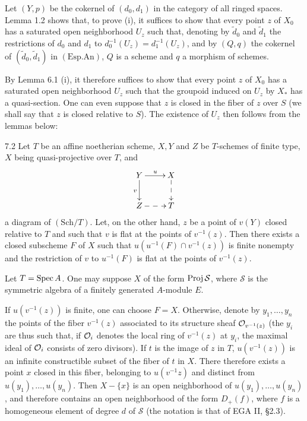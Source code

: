Let $(Y,p)$ be the cokernel of $(d_0,d_1)$ in the category of all ringed spaces. Lemma 1.2 shows that, to prove (i), it suffices to show that every point $z$ of $X_0$ has a saturated open neighborhood $U_z$ such that, denoting by $\widetilde d_0$ and $\widetilde d_1$ the restrictions of $d_0$ and $d_1$ to $d_0^{-1}(U_z)=d_1^{-1}(U_z)$, and by $(Q,q)$ the cokernel of $(\widetilde d_0,\widetilde d_1)$ in $(\mathrm{Esp.An})$, $Q$ is a scheme and $q$ a morphism of schemes.

By Lemma 6.1 (i), it therefore suffices to show that every point $z$ of $X_0$ has a saturated open neighborhood $U_z$ such that the groupoid induced on $U_z$ by $X_*$ has a quasi-section. One can even suppose that $z$ is closed in the fiber of $z$ over $S$ (we shall say that $z$ is closed relative to $S$). The existence of $U_z$ then follows from the lemmas below:
\begin{lemma}{7.2}\label{V.7.2}
Let $T$ be an affine noetherian scheme, $X,Y$ and $Z$ be $T$-schemes of finite type, $X$ being quasi-projective over $T$, and
\[
\xymatrix{Y\ar[r]^u\ar[d]_v&X\ar@{-->}[d]\\Z\ar@{-->}[r]&T}
\]
a diagram of $(\mathrm{Sch}/T)$. Let, on the other hand, $z$ be a point of $v(Y)$ closed relative to $T$ and such that $v$ is flat at the points of $v^{-1}(z)$. Then there exists a closed subscheme $F$ of $X$ such that $u(u^{-1}(F)\cap v^{-1}(z))$ is finite nonempty and the restriction of $v$ to $u^{-1}(F)$ is flat at the points of $v^{-1}(z)$.
\end{lemma}
Let $T=\operatorname{Spec} A$. One may suppose $X$ of the form $\operatorname{Proj}\mathcal S$, where $\mathcal S$ is the symmetric algebra of a finitely generated $A$-module $E$.

If $u(v^{-1}(z))$ is finite, one can choose $F=X$. Otherwise, denote by $y_1,\ldots,y_n$ the points of the fiber $v^{-1}(z)$ associated to its structure sheaf $\mathcal{O}_{v^{-1}(z)}$ (the $y_i$ are thus such that, if $\mathcal{O}_i$ denotes the local ring of $v^{-1}(z)$ at $y_i$, the maximal ideal of $\mathcal{O}_i$ consists of zero divisors). If $t$ is the image of $z$ in $T$, $u(v^{-1}(z))$ is an infinite constructible subset of the fiber of $t$ in $X$. There therefore exists a point $x$ closed in this fiber, belonging to $u(v^{-1}z)$ and distinct from $u(y_1),\ldots,u(y_n)$. Then $X-\{x\}$ is an open neighborhood of $u(y_1),\ldots,u(y_n)$, and therefore contains an open neighborhood of the form $D_+(f)$, where $f$ is a homogeneous element of degree $d$ of $\mathcal S$ (the notation is that of EGA II, §2.3).

